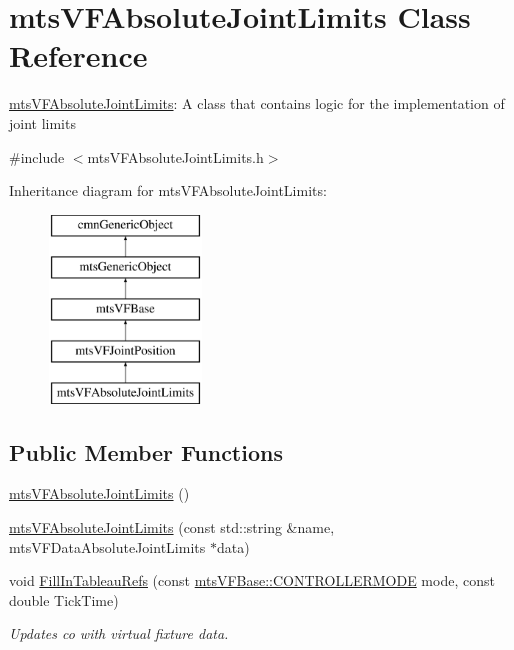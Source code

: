 \hypertarget{classmts_v_f_absolute_joint_limits}{\section{mts\-V\-F\-Absolute\-Joint\-Limits Class Reference}
\label{classmts_v_f_absolute_joint_limits}
}


\hyperlink{classmts_v_f_absolute_joint_limits}{mts\-V\-F\-Absolute\-Joint\-Limits}\-: A class that contains logic for the implementation of joint limits  




{\ttfamily \#include $<$mts\-V\-F\-Absolute\-Joint\-Limits.\-h$>$}

Inheritance diagram for mts\-V\-F\-Absolute\-Joint\-Limits\-:\begin{figure}[H]
\begin{center}
\leavevmode
\includegraphics[height=5.000000cm]{db/daa/classmts_v_f_absolute_joint_limits}
\end{center}
\end{figure}
\subsection*{Public Member Functions}
\begin{DoxyCompactItemize}
\item 
\hyperlink{classmts_v_f_absolute_joint_limits_af4d57d292a62561abb5cacb25ec96679}{mts\-V\-F\-Absolute\-Joint\-Limits} ()
\item 
\hyperlink{classmts_v_f_absolute_joint_limits_a8f1965e8ebce5cf757655bb99d125871}{mts\-V\-F\-Absolute\-Joint\-Limits} (const std\-::string \&name, mts\-V\-F\-Data\-Absolute\-Joint\-Limits $\ast$data)
\item 
void \hyperlink{classmts_v_f_absolute_joint_limits_acc0644621e6f736f39777500b3530890}{Fill\-In\-Tableau\-Refs} (const \hyperlink{classmts_v_f_base_a742dd08f8b70bafeb746cec14d9ee974}{mts\-V\-F\-Base\-::\-C\-O\-N\-T\-R\-O\-L\-L\-E\-R\-M\-O\-D\-E} mode, const double Tick\-Time)
\begin{DoxyCompactList}\small\item\em Updates co with virtual fixture data. \end{DoxyCompactList}\end{DoxyCompactItemize}
